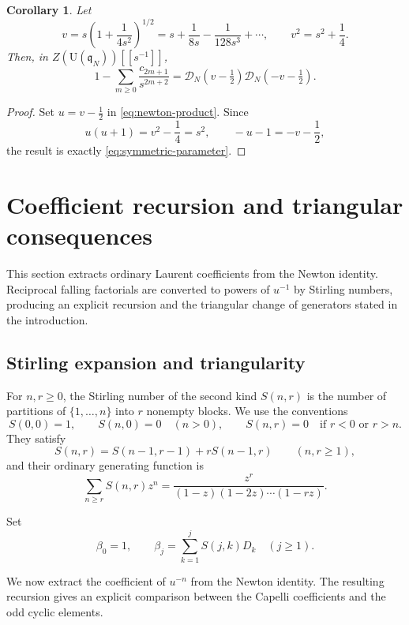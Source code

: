 \documentclass[11pt]{amsart}
\numberwithin{equation}{section}
\newtheorem{corollary}[theorem]{Corollary}
\theoremstyle{definition}
\theoremstyle{remark}
\newcommand{\q}{\mathfrak q}
\newcommand{\U}{\mathrm U}
\newcommand{\calD}{\mathcal D}
\begin{document}
\begin{corollary}
\label{cor:symmetric-parameter}
Let
\[
 v=s\left(1+\frac{1}{4s^2}\right)^{1/2}
 =s+\frac{1}{8s}-\frac{1}{128s^3}+\cdots,
 \qquad v^2=s^2+\frac14.
\]
Then, in \(Z(\U(\q_N))[[s^{-1}]]\),
\begin{equation}
 \boxed{
 1-\sum_{m\geq0}\frac{c_{2m+1}}{s^{2m+2}}
 =\calD_N\left(v-\tfrac12\right)
  \calD_N\left(-v-\tfrac12\right).}
 \label{eq:symmetric-parameter}
\end{equation}
\end{corollary}

\begin{proof}
Set \(u=v-\tfrac12\) in \eqref{eq:newton-product}.  Since
\[
 u(u+1)=v^2-\frac14=s^2,
 \qquad -u-1=-v-\frac12,
\]
the result is exactly \eqref{eq:symmetric-parameter}.
\end{proof}

\section{Coefficient recursion and triangular consequences}
\label{sec:coefficients}

This section extracts ordinary Laurent coefficients from the Newton
identity.  Reciprocal falling factorials are converted to powers of
\(u^{-1}\) by Stirling numbers, producing an explicit recursion and the
triangular change of generators stated in the introduction.

\subsection{Stirling expansion and triangularity}
\label{subsec:stirling-triangularity} For \(n,r\geq0\), the Stirling number of the second kind \(S(n,r)\) is
the number of partitions of \(\{1,\ldots,n\}\) into \(r\) nonempty
blocks. We use the conventions
\[
S(0,0)=1,\qquad
S(n,0)=0\quad(n>0),\qquad
S(n,r)=0\quad\text{if }r<0\text{ or }r>n.
\]
They satisfy
\[
S(n,r)=S(n-1,r-1)+rS(n-1,r)
\qquad(n,r\geq1),
\]
and their ordinary generating function is
\[
\sum_{n\geq r}S(n,r)z^n
=
\frac{z^r}{(1-z)(1-2z)\cdots(1-rz)}.
\]

Set
\begin{equation}
 \beta_0=1,
 \qquad
 \beta_j=\sum_{k=1}^jS(j,k)D_k\quad(j\geq1).
 \label{eq:beta-definition}
\end{equation}

We now extract the coefficient of \(u^{-n}\) from the Newton identity.
The resulting recursion gives an explicit comparison between the
Capelli coefficients and the odd cyclic elements.
\end{document}
